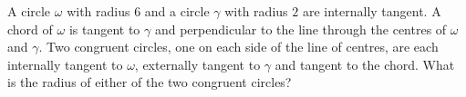 A circle $\omega$ with radius $6$ and a circle $\gamma$ with radius $2$ are internally tangent. A chord of $\omega$ is tangent to $\gamma$ and perpendicular to the line through the centres of $\omega$ and $\gamma$. Two congruent circles, one on each side of the line of centres, are each internally tangent to $\omega$, externally tangent to $\gamma$ and tangent to the chord. What is the radius of either of the two congruent circles?
